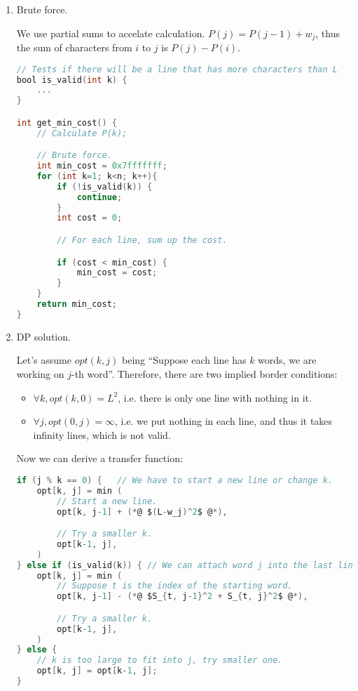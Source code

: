 \begin{enumerate}
    \item Brute force.

          We use partial sums to accelate calculation. $P(j) = P(j-1) + w_j$, thus the sum of characters from $i$ to $j$ is $P(j) - P(i)$.
          \begin{lstlisting}[language = C]
// Tests if there will be a line that has more characters than L
bool is_valid(int k) {
    ...
}

int get_min_cost() {
    // Calculate P(k);

    // Brute force.
    int min_cost = 0x7fffffff;
    for (int k=1; k<n; k++){
        if (!is_valid(k)) {
            continue;
        }
        int cost = 0;

        // For each line, sum up the cost.

        if (cost < min_cost) {
            min_cost = cost;
        }
    }
    return min_cost;
}
    \end{lstlisting}
    \item DP solution.

          Let's assume $opt(k, j)$ being ``Suppose each line has $k$ words, we are working on $j$-th word''.
          Therefore, there are two implied border conditions:
          \begin{itemize}
              \item $\forall k, opt(k, 0) = L^2$, i.e. there is only one line with nothing in it.
              \item $\forall j, opt(0, j) = \infty$, i.e. we put nothing in each line, and thus it takes infinity lines, which is not valid.
          \end{itemize}

          Now we can derive a transfer function:

          \begin{minipage}{\linewidth}
              \begin{lstlisting}[language=c]
if (j % k == 0) {   // We have to start a new line or change k.
    opt[k, j] = min (
        // Start a new line.
        opt[k, j-1] + (*@ $(L-w_j)^2$ @*),     

        // Try a smaller k.
        opt[k-1, j],                            
    )
} else if (is_valid(k)) { // We can attach word j into the last line if there is enough space.
    opt[k, j] = min (
        // Suppose t is the index of the starting word.
        opt[k, j-1] - (*@ $S_{t, j-1}^2 + S_{t, j}^2$ @*), 

        // Try a smaller k.
        opt[k-1, j],                            
    )
} else {
    // k is too large to fit into j, try smaller one.
    opt[k, j] = opt[k-1, j];                   
}
\end{lstlisting}
          \end{minipage}
\end{enumerate}